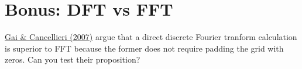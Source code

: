\documentclass[11pt, preprint]{aastex}
\begin{document}
\section{Bonus: DFT vs FFT}

\href{https://academic.oup.com/mnras/article/377/3/1337/1746974}{Gai
  \& Cancellieri (2007)} argue that a direct discrete Fourier tranform
calculation is superior to FFT because the former does not require
padding the grid with zeros. Can you test their proposition?
\end{document}
